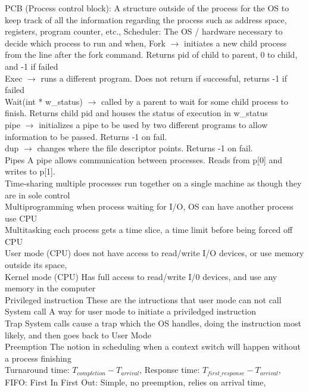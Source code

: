 \documentclass[6pt]{article}
\begin{document}
PCB (Process control block):
A structure outside of the process for the OS to keep track of all the information regarding the process such as address space, registers, program counter, etc.,
Scheduler:
The OS / hardware necessary to decide which process to run and when,
Fork $\rightarrow$ initiates a new child process from the line after the fork command. Returns pid of child to parent, 0 to child, and -1 if failed
\\
Exec $\rightarrow$ runs a different program. Does not return if successful, returns -1 if failed
\\
Wait(int * w\_status) $\rightarrow$ called by a parent to wait for some child process to finish. Returns child pid and houses the status of execution in w\_status
\\
pipe $\rightarrow$ initializes a pipe to be used by two different programs to allow information to be passed. Returns -1 on fail.
\\
dup $\rightarrow$ changes where the file descriptor points. Returns -1 on fail.
\\
Pipes
A pipe allows communication between processes. Reads from p[0] and writes to p[1].
\\
Time-sharing
multiple processes run together on a single machine as though they are in sole control
\\
Multiprogramming
when process waiting for I/O, OS can have another process use CPU
\\
Multitasking
each process gets a time slice, a time limit before being forced off CPU
\\
User mode (CPU)
does not have access to read/write I/O devices, or use memory outside its space,
\\
Kernel mode (CPU)
Has full access to read/write I/0 devices, and use any memory in the computer
\\
Privileged instruction
These are the intructions that user mode can not call
\\
System call
A way for user mode to initiate a priviledged instruction
\\
Trap
System calls cause a trap which the OS handles, doing the instruction most likely, and then goes back to User Mode
\\
Preemption
The notion in scheduling when a context switch will happen without a process finishing
\\
Turnaround time:
$T_{completion} - T_{arrival}$,
Response time:
$T_{first\_response}-T_{arrival}$,
\\
FIFO:
First In First Out: Simple, no preemption, relies on arrival time,
\end{document}
